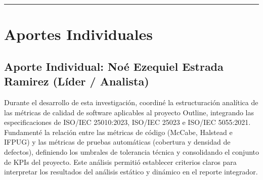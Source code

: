 \documentclass[12pt, letterpaper]{article}
\begin{document}
\vspace{0.8cm}
\hrule
\vspace{0.5cm}


\section{Aportes Individuales}

\subsection*{Aporte Individual: Noé Ezequiel Estrada Ramirez (Líder / Analista)}

Durante el desarrollo de esta investigación, coordiné la estructuración analítica de las métricas de calidad de software aplicables al proyecto Outline, integrando las especificaciones de ISO/IEC 25010:2023, ISO/IEC 25023 e ISO/IEC 5055:2021. Fundamenté la relación entre las métricas de código (McCabe, Halstead e IFPUG) y las métricas de pruebas automáticas (cobertura y densidad de defectos), definiendo los umbrales de tolerancia técnica y consolidando el conjunto de KPIs del proyecto. Este análisis permitió establecer criterios claros para interpretar los resultados del análisis estático y dinámico en el reporte integrador.

\vspace{0.8cm}

\end{document}
